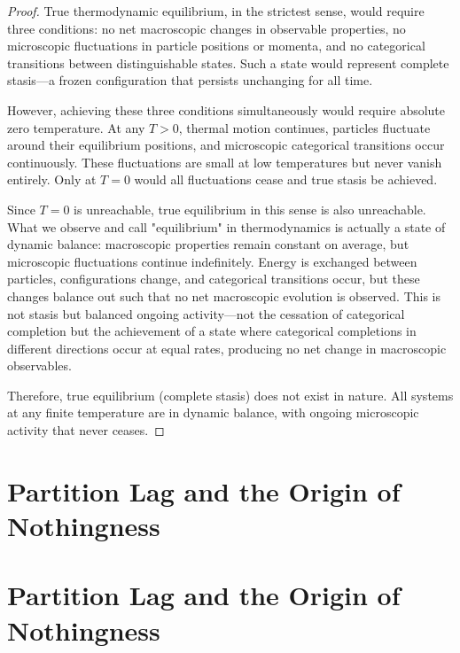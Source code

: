 \documentclass[12pt,a4paper]{article}
\theoremstyle{definition}
\theoremstyle{remark}
\begin{document}
\begin{proof}
True thermodynamic equilibrium, in the strictest sense, would require three conditions: no net macroscopic changes in observable properties, no microscopic fluctuations in particle positions or momenta, and no categorical transitions between distinguishable states. Such a state would represent complete stasis—a frozen configuration that persists unchanging for all time.

However, achieving these three conditions simultaneously would require absolute zero temperature. At any $T > 0$, thermal motion continues, particles fluctuate around their equilibrium positions, and microscopic categorical transitions occur continuously. These fluctuations are small at low temperatures but never vanish entirely. Only at $T = 0$ would all fluctuations cease and true stasis be achieved.

Since $T = 0$ is unreachable, true equilibrium in this sense is also unreachable. What we observe and call "equilibrium" in thermodynamics is actually a state of dynamic balance: macroscopic properties remain constant on average, but microscopic fluctuations continue indefinitely. Energy is exchanged between particles, configurations change, and categorical transitions occur, but these changes balance out such that no net macroscopic evolution is observed. This is not stasis but balanced ongoing activity—not the cessation of categorical completion but the achievement of a state where categorical completions in different directions occur at equal rates, producing no net change in macroscopic observables.

Therefore, true equilibrium (complete stasis) does not exist in nature. All systems at any finite temperature are in dynamic balance, with ongoing microscopic activity that never ceases.
\end{proof}




\section{Partition Lag and the Origin of Nothingness}
\label{sec:partition_lag}
\section{Partition Lag and the Origin of Nothingness}
\label{sec:partition_lag}
\end{document}
